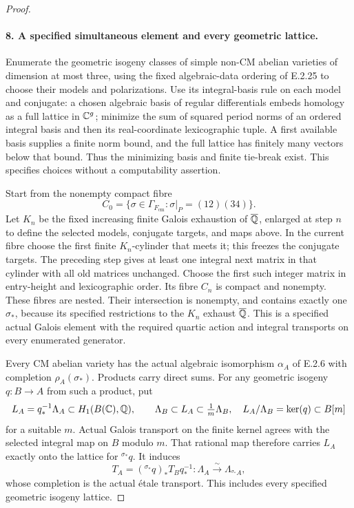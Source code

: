 \begin{proof}
\paragraph{8. A specified simultaneous element and every geometric lattice.}
Enumerate the geometric isogeny classes of
simple non-CM abelian varieties of dimension
at most three, using the fixed algebraic-data
ordering of E.2.25 to choose their models
and polarizations. Use its integral-basis
rule on each model and conjugate: a chosen
algebraic basis of regular differentials
embeds homology as a full lattice in
\(\mathbb C^g\); minimize the sum of squared
period norms of an ordered integral basis
and then its real-coordinate lexicographic
tuple. A first available basis supplies a
finite norm bound, and the full lattice
has finitely many vectors below that bound.
Thus the minimizing basis and finite
tie-break exist. This specifies choices
without a computability assertion.

Start from the nonempty compact fibre
\[
 C_0=\{\sigma\in\Gamma_{F_{\mathrm{cm}}}:
                  \sigma|_P=(12)(34)\}.
\]
Let \(K_n\) be the fixed increasing finite
Galois exhaustion of \(\overline{\mathbb Q}\), enlarged
at step \(n\) to define the selected
models, conjugate targets, and maps above.
In the current fibre choose the first
finite \(K_n\)-cylinder that meets it;
this freezes the conjugate targets. The
preceding step gives at least one integral
next matrix in that cylinder with all old
matrices unchanged. Choose the first such
integer matrix in entry-height and
lexicographic order. Its fibre \(C_n\)
is compact and nonempty. These fibres are
nested. Their intersection is nonempty,
and contains exactly one \(\sigma_*\),
because its specified restrictions to
the \(K_n\) exhaust \(\overline{\mathbb Q}\).
This is a specified actual Galois element
with the required quartic action and
integral transports on every enumerated
generator.

Every CM abelian variety has the actual
algebraic isomorphism \(\alpha_A\) of
E.2.6 with completion \(\rho_A(\sigma_*)\).
Products carry direct sums. For any
geometric isogeny \(q:B\to A\) from
such a product, put
\[
 L_A=q_*^{-1}\Lambda_A\subset H_1(B(\mathbb C),\mathbb Q),
 \qquad \Lambda_B\subset L_A\subset\tfrac1m\Lambda_B,
 \quad L_A/\Lambda_B=\ker(q)\subset B[m]
\]
for a suitable \(m\). Actual Galois
transport on the finite kernel agrees
with the selected integral map on \(B\)
modulo \(m\). That rational map
therefore carries \(L_A\) exactly onto
the lattice for \({}^{\sigma_*}q\).
It induces
\[
 T_A=({}^{\sigma_*}q)_*T_Bq_*^{-1}:
     \Lambda_A\xrightarrow{\sim}
     \Lambda_{{}^{\sigma_*}A},
 \tag{E.2.26r}
\]
whose completion is the actual
\'{e}tale transport. This includes every
specified geometric isogeny lattice.


\end{proof}
